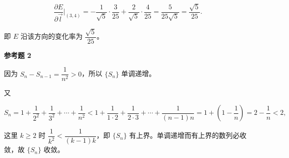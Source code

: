 \begin{answer}
\nopagebreak[4]
\[
\frac{\partial E}{\partial\vec{l}}\bigg|_{(3,4)}
=-\frac{1}{\sqrt{5}}\cdot\frac{3}{25}
+\frac{2}{\sqrt{5}}\cdot\frac{4}{25}
=\frac{5}{25\sqrt{5}}
=\frac{\sqrt{5}}{25}.
\]

即 $E$ 沿该方向的变化率为 $\dfrac{\sqrt{5}}{25}$。

\textbf{参考题 2}

因为 $S_{n}-S_{n-1}=\dfrac{1}{n^{2}}>0$，所以 $\{S_{n}\}$ 单调递增。

又

\nopagebreak[4]
\[
S_{n}=1+\frac{1}{2^{2}}+\frac{1}{3^{2}}+\cdots+\frac{1}{n^{2}}
<1+\frac{1}{1\cdot2}+\frac{1}{2\cdot3}+\cdots+\frac{1}{(n-1)n}
=1+\left(1-\frac{1}{n}\right)=2-\frac{1}{n}<2,
\]

这里 $k\geqslant2$ 时 $\dfrac{1}{k^{2}}<\dfrac{1}{(k-1)k}$，即 $\{S_{n}\}$ 有上界。单调递增而有上界的数列必收敛，故 $\{S_{n}\}$ 收敛。


\end{answer}